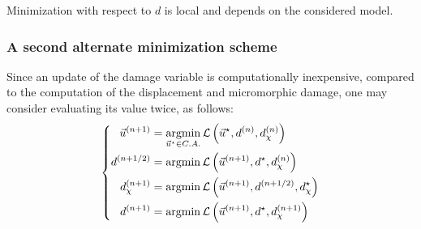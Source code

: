 
Minimization with respect to \(d\) is local and depends on the considered model.

\subsubsection{A second alternate minimization scheme}

Since an update of the damage variable is computationally inexpensive,
compared to the computation of the displacement and micromorphic damage,
one may consider evaluating its value twice, as follows:
%
%
%
\begin{equation}
  \left\{
  \begin{aligned}
  \iter{n+1}{\vec{u}} &= \underset{\vec{u}^{\star}\in C.A.}{\argmin}\, \mathcal{L}\paren{\vec{u}^{\star},\iter{n}{d},\iter{n}{d_{\chi}}}\\
  \iter{n+1/2}{d} &= \argmin \,\mathcal{L}\paren{\iter{n+1}{\vec{u}},d^{\star},\iter{n}{d_{\chi}}} \\
  \iter{n+1}{d_{\chi}} &= \argmin \,\mathcal{L}\paren{\iter{n+1}{\vec{u}},\iter{n+1/2}{d},d_{\chi}^{\star}} \\
  \iter{n+1}{d} &= \argmin \,\mathcal{L}\paren{\iter{n+1}{\vec{u}},d^{\star},\iter{n+1}{d_{\chi}}} \\
  \end{aligned}
  \right.
\end{equation}

